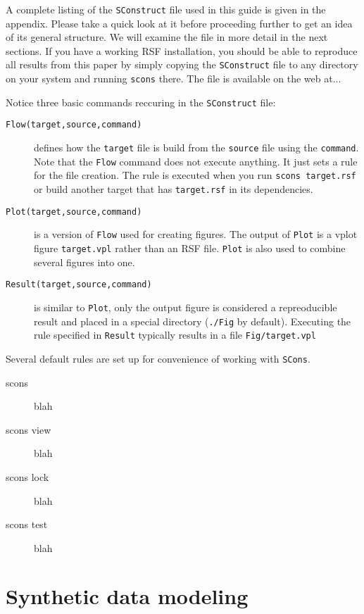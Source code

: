 A complete listing of the \texttt{SConstruct} file used in this guide
is given in the appendix. Please take a quick look at it before
proceeding further to get an idea of its general structure. We will
examine the file in more detail in the next sections. If you have a
working RSF installation, you should be able to reproduce all results
from this paper by simply copying the \texttt{SConstruct} file to any
directory on your system and running \texttt{scons} there. The file is
available on the web at...

Notice three basic commands reccuring in the \texttt{SConstruct} file:
\begin{description}
\item[\texttt{Flow(target,source,command)}] defines how the
  \texttt{target} file is build from the \texttt{source} file using the
  \texttt{command}. Note that the \texttt{Flow} command does not
  execute anything. It just sets a rule for the file creation. The
  rule is executed when you run \texttt{scons target.rsf} or build
  another target that has \texttt{target.rsf} in its dependencies.
\item[\texttt{Plot(target,source,command)}] is a version of
  \texttt{Flow} used for creating figures. The output of \texttt{Plot}
  is a vplot figure \texttt{target.vpl} rather than an RSF file.
  \texttt{Plot} is also used to combine several figures into one.
\item[\texttt{Result(target,source,command)}] is similar to
  \texttt{Plot}, only the output figure is considered a repreoducible
  result and placed in a special directory (\texttt{./Fig} by
  default). Executing the rule specified in \texttt{Result} typically
  results in a file \texttt{Fig/target.vpl}
\end{description}

Several default rules are set up for convenience of working with
\texttt{SCons}.
\begin{description}
\item[scons] blah
\item[scons view] blah
\item[scons lock] blah
\item[scons test] blah
\end{description}

\section{Synthetic data modeling}

 \clearpage
{} \clearpage
{} \clearpage

